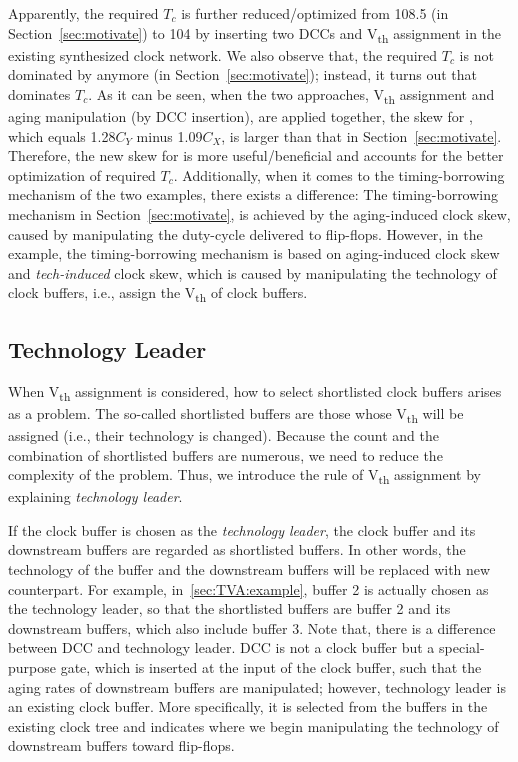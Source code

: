 Apparently, the required $T_c$ is further reduced/optimized from 108.5 (in Section~\ref{sec:motivate}) to 104 by inserting two DCCs and V\textsubscript{th} assignment in the existing synthesized clock network. We also observe that, the required $T_c$ is not dominated by  anymore (in Section~\ref{sec:motivate}); instead, it turns out that  dominates $T_c$. As it can be seen, when the two approaches, V\textsubscript{th} assignment and aging manipulation  (by DCC insertion), are applied together, the skew for , which equals 1.28$C_Y$ minus 1.09$C_X$, is larger than that in Section~\ref{sec:motivate}. Therefore, the new skew for  is more useful/beneficial and accounts for the better optimization of required $T_c$. 
Additionally, when it comes to the timing-borrowing mechanism of the two examples, there exists a difference: The timing-borrowing mechanism in Section~\ref{sec:motivate}, is achieved by the aging-induced clock skew, caused by manipulating the duty-cycle delivered to flip-flops. However, in the example, the timing-borrowing mechanism is based on aging-induced clock skew and \textit{tech-induced} clock skew, which is caused by manipulating the technology of clock buffers, i.e., assign the V\textsubscript{th} of clock buffers. 

\subsection{Technology Leader}
\label{sec:TVA:leader}
When V\textsubscript{th} assignment is considered, how to select shortlisted clock buffers arises as a problem. The so-called shortlisted buffers are those whose V\textsubscript{th} will be assigned (i.e., their technology is changed). Because the count and the combination of shortlisted buffers are numerous, we need to reduce the complexity of the problem. Thus, we introduce the rule of V\textsubscript{th} assignment by explaining \textit{technology leader}. 

If the clock buffer is chosen as the \textit{technology leader}, the clock buffer and its downstream buffers are regarded as shortlisted buffers. In other words, the technology of the buffer and the downstream buffers will be replaced with new counterpart. For example, in~\ref{sec:TVA:example}, buffer 2 is actually chosen as the technology leader, so that the shortlisted buffers are buffer 2 and its downstream buffers, which also include buffer 3. Note that, there is a difference between DCC and technology leader. DCC is not a clock buffer but a special-purpose gate, which is inserted at the input of the clock buffer, such that the aging rates of downstream buffers are manipulated; however, technology leader is an existing clock buffer. More specifically, it is selected from the buffers in the existing clock tree and indicates where we begin manipulating the technology of downstream buffers toward flip-flops.

